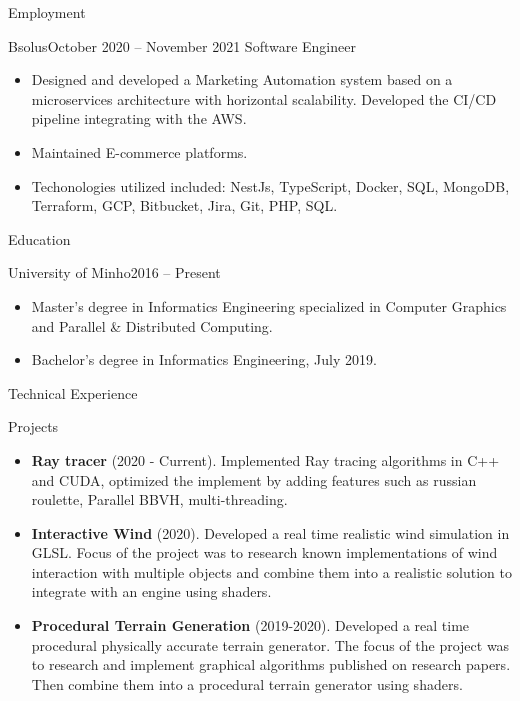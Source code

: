 \documentclass[]{mcdowellcv}
\begin{document}
	\makeheader

	\begin{cvsection}{Employment}
		\begin{cvsubsection}{Bsolus}{}{October 2020 -- November 2021}
			Software Engineer
			\begin{itemize}
                \item Designed and developed a Marketing Automation system based on a microservices architecture with horizontal scalability. Developed the CI/CD pipeline integrating with the AWS.
                \item Maintained E-commerce platforms.
                \item Techonologies utilized included: NestJs, TypeScript, Docker, SQL, MongoDB, Terraform, GCP, Bitbucket, Jira, Git, PHP, SQL.
			\end{itemize}
		\end{cvsubsection}
	\end{cvsection}

	\begin{cvsection}{Education}
		\begin{cvsubsection}{University of Minho}{}{2016 -- Present}
			\begin{itemize}
                \item Master’s degree in Informatics Engineering specialized in Computer Graphics and Parallel \& Distributed Computing.
                \item Bachelor's degree in Informatics Engineering, July 2019.
			\end{itemize}
		\end{cvsubsection}
	\end{cvsection}

	\begin{cvsection}{Technical Experience}
		\begin{cvsubsection}{Projects}{}{}
			\begin{itemize}
				\item \textbf{Ray tracer} (2020 - Current). Implemented Ray tracing algorithms in C++ and CUDA, optimized the implement by adding features such as russian roulette, Parallel BBVH, multi-threading.
				\item \textbf{Interactive Wind} (2020). Developed a real time realistic wind simulation in GLSL. Focus of the project was to research known implementations of wind interaction with multiple objects and combine them into a realistic solution to integrate with an engine using shaders.
				\item \textbf{Procedural Terrain Generation} (2019-2020). Developed a real time procedural physically accurate terrain generator. The focus of the project was to research and implement graphical algorithms published on research papers. Then combine them into a procedural terrain generator using shaders.
			\end{itemize}
		\end{cvsubsection}
	\end{cvsection}
\end{document}
